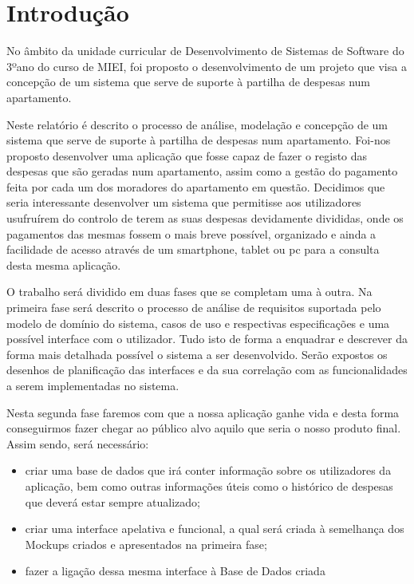 \chapter{Introdução}

No âmbito da unidade curricular de Desenvolvimento de Sistemas de Software do 3ºano do curso de MIEI,  foi proposto o desenvolvimento de um projeto que visa a concepção de um sistema que serve de suporte à partilha de despesas num apartamento.

Neste relatório é descrito o processo de análise, modelação e concepção de um sistema que serve de suporte à partilha de despesas num apartamento. Foi-nos proposto desenvolver uma aplicação que fosse capaz de fazer o registo das despesas que são geradas num apartamento, assim como a gestão do pagamento feita por cada um dos moradores do apartamento em questão.
Decidimos que seria interessante desenvolver um sistema que permitisse aos utilizadores usufruírem do controlo de terem as suas despesas devidamente divididas, onde os pagamentos das mesmas fossem o mais breve possível, organizado e ainda a facilidade de acesso através de um smartphone, tablet ou pc para a consulta desta mesma aplicação.

O trabalho será dividido em duas fases que se completam uma à outra.
Na primeira fase será descrito o processo de análise de requisitos suportada pelo modelo de domínio do sistema, casos de uso e respectivas especificações e uma possível interface com o utilizador. Tudo isto de forma a enquadrar e descrever da forma mais detalhada possível o sistema a ser desenvolvido. Serão expostos os desenhos de planificação das interfaces e da sua correlação com as funcionalidades a serem implementadas no sistema.

Nesta segunda fase faremos com que a nossa aplicação ganhe vida e desta forma conseguirmos fazer chegar ao público alvo aquilo que seria o nosso produto final. Assim sendo, será necessário:

\begin{itemize}
	\item criar uma base de dados que irá conter informação sobre os utilizadores da aplicação, bem como outras informações úteis como o histórico de despesas que deverá estar sempre atualizado;
	
	\item criar uma interface apelativa e funcional, a qual será criada à semelhança dos Mockups criados e apresentados na primeira fase; 
	
	\item fazer a ligação dessa mesma interface à Base de Dados criada
\end{itemize}

